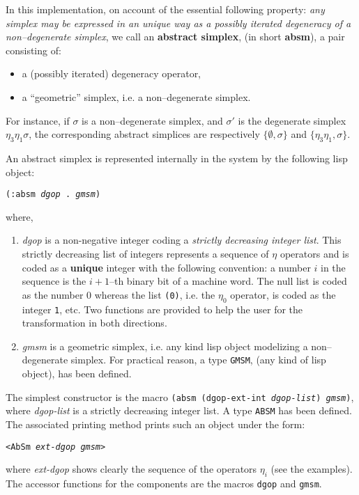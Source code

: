 In this implementation,
on account of the essential following property: {\em any simplex
may be expressed in an unique way as a possibly iterated degeneracy of a non--degenerate
simplex}, we call an {\bf abstract simplex}, (in short {\bf absm}), a pair consisting of:
\begin{itemize}
\item a (possibly iterated) degeneracy operator,
\item a ``geometric'' simplex, i.e. a non--degenerate simplex.
\end{itemize}
For instance, if $\sigma$ is a non--degenerate simplex, and $\sigma'$ is the degenerate simplex
$\eta_3\eta_1\sigma$, the corresponding abstract simplices are respectively
$\lbrace \emptyset, \sigma \rbrace$ and $\lbrace \eta_3\eta_1, \sigma \rbrace$.
\par
An abstract simplex is represented internally in the system by the following lisp object:
\begin{center}
{\tt (:absm {\em dgop} . {\em gmsm})}
\end{center}
where,
\begin{enumerate}
\item {\em dgop} is a non-negative integer coding
a {\em strictly decreasing integer list}.
This strictly  decreasing list of integers represents a sequence
of $\eta$ o\-pe\-ra\-tors and is coded as a {\bf unique} integer with the following convention: a number $i$ in
the sequence is the $i+1$--th binary bit of a machine word. The null list is coded as the number $0$ whereas
the list {\tt (0)}, i.e. the $\eta_0$ operator, is coded as the integer {\tt 1}, etc.
Two functions are provided to help the user for the transformation in both directions.
\item {\em gmsm} is a geometric simplex,  i.e. any kind lisp object   modelizing a non--degenerate
simplex. For practical reason, a  type {\tt GMSM}, (any kind of lisp object), has been defined.
\end{enumerate}
The simplest constructor is the macro  {\tt (absm (dgop-ext-int {\em dgop-list}) {\em gmsm})},
where {\em dgop-list} is a strictly decreasing integer list. A type {\tt ABSM} has been defined.
The associated printing method prints such an object under the form:
\begin{center}
{\tt <AbSm {\em ext-dgop gmsm}>}
\end{center}
where {\em ext-dgop} shows clearly the sequence of the operators $\eta_i$ (see the e\-xam\-ples).
The accessor functions for the components are the macros {\tt dgop} and {\tt gmsm}.
\newpage

